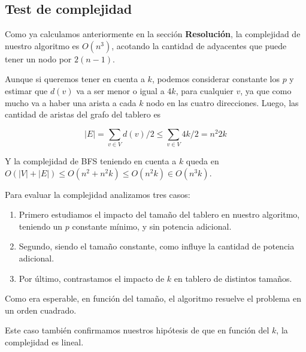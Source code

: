 \subsection{Test de complejidad}

Como ya calculamos anteriormente en la secci\'on \textbf{Resoluci\'on}, la complejidad de nuestro algoritmo es $O(n^3)$, acotando la cantidad de adyacentes que puede tener un nodo por $2(n-1)$. 

Aunque si queremos tener en cuenta a $k$, podemos considerar constante los $p$ y estimar que $d(v)$ va a ser menor o igual a $4k$, para cualquier $v$, ya que como mucho va a haber una arista a cada $k$ nodo en las cuatro direcciones. Luego, las cantidad de aristas del grafo del tablero es

\begin{equation*}
 |E| = \sum_{v \in V} d(v) / 2 \leq \sum_{v \in V} 4k / 2 = n^2 2k
\end{equation*}

Y la complejidad de BFS teniendo en cuenta a $k$ queda en $O(|V|+|E|) \leq O(n^2 + n^2 k) \leq O(n^2k) \in O(n^3k)$. 

Para evaluar la complejidad analizamos tres casos: 

\begin{enumerate}
 \item Primero estudiamos el impacto del tama\~no del tablero en nuestro algoritmo, teniendo un $p$ constante m\'inimo, y sin potencia adicional. 
 
 \item Segundo, siendo el tama\~no constante, como influye la cantidad de potencia adicional. 
 
 \item Por \'ultimo, contrastamos el impacto de $k$ en tablero de distintos tama\~nos. 
\end{enumerate}

Como era esperable, en funci\'on del tama\~no, el algoritmo resuelve el problema en un orden cuadrado. 


Este caso tambi\'en confirmamos nuestros hip\'otesis de que en funci\'on del $k$, la complejidad es lineal. 


